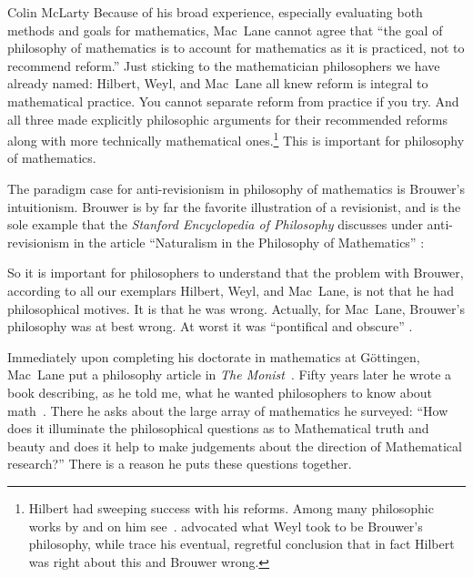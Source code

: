 \begin{artengenv}{Colin McLarty}
Because of his broad experience, especially evaluating both methods and goals for mathematics, Mac~Lane cannot agree that ``the goal of philosophy of mathematics is to account for mathematics as it is practiced, not to recommend reform.'' \parencite[p.~161]{MadNat} %
Just sticking to the mathematician philosophers we have already named: Hilbert, Weyl, and Mac~Lane all knew reform is integral to mathematical practice.  You cannot separate reform from practice if you try.  And all three made explicitly philosophic arguments for their recommended reforms along with more technically mathematical ones.\footnote{Hilbert had sweeping success with his reforms.  Among many philosophic works by and on  him see~\textcite{HilbLogGrund,HilbNaturerkennen}. \textcite{WeylKontinuum} advocated what Weyl took to be Brouwer's philosophy, while \textcite{WeylDer,WeylOf} trace his eventual, regretful conclusion that in fact Hilbert was right about this and Brouwer wrong.}   This is important for philosophy of mathematics.

The paradigm case for anti-revisionism in philosophy of mathematics is Brouwer's intuitionism.  Brouwer is by far the favorite illustration of a revisionist, and is the sole example that the \textit{Stanford Encyclopedia of Philosophy} discusses under anti-revisionism in the article ``Naturalism in the Philosophy of Mathematics'' \parencite{SEPnaturalism}:

So it is important for philosophers to understand that the problem with Brouwer, according to all our exemplars Hilbert, Weyl, and Mac~Lane, is not that he had philosophical motives.  It is that he was wrong.  Actually, for Mac~Lane, Brouwer's philosophy was at best wrong.  At worst it was ``pontifical and obscure'' \parencite{MacLSymbolic}.

Immediately upon completing his doctorate in mathematics at G\"ot\-tin\-gen, Mac~Lane put a philosophy article in  \textit{The Monist}~\parencite{MacLMonist}.  Fifty years later he wrote a book describing, as he told me, what he wanted philosophers to know about math~\parencite{MFF}.  There he asks about the large array of mathematics he surveyed:
``How does it illuminate the philosophical questions as to
Mathematical truth and beauty and does it help to make judgements
about the direction of Mathematical research?''  \parencite[p.~409]{MFF}
There is a reason he puts these questions together.


\end{artengenv}
